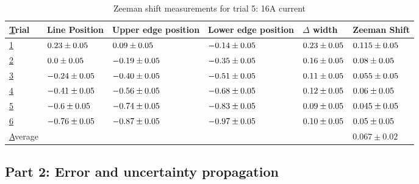 \begin{table}[H]
    \begin{adjustwidth}{-100pt}{-100pt}
        \centering
        \begin{tabular}{|l|l|l|l|l|l|}
            \hline
            {\ul Trial}   & Line Position                & Upper edge position          & Lower edge position          & $\Delta$ width              & Zeeman Shift                 \\ \hline
            {\ul 1}       & $0.23 \pm 0.05$  & $0.09 \pm 0.05$  & $-0.14 \pm 0.05$ & $0.23 \pm 0.05$ & $0.115 \pm 0.05$ \\ \hline
            {\ul 2}       & $0.0 \pm 0.05$   & $-0.19 \pm 0.05$ & $-0.35 \pm 0.05$ & $0.16 \pm 0.05$ & $0.08 \pm 0.05$  \\ \hline
            {\ul 3}       & $-0.24 \pm 0.05$ & $-0.40 \pm 0.05$ & $-0.51 \pm 0.05$ & $0.11 \pm 0.05$ & $0.055 \pm 0.05$ \\ \hline
            {\ul 4}       & $-0.41 \pm 0.05$ & $-0.56 \pm 0.05$ & $-0.68 \pm 0.05$ & $0.12 \pm 0.05$ & $0.06 \pm 0.05$  \\ \hline
            {\ul 5}       & $-0.6 \pm 0.05$  & $-0.74 \pm 0.05$ & $-0.83 \pm 0.05$ & $0.09 \pm 0.05$ & $0.045 \pm 0.05$ \\ \hline
            {\ul 6}       & $-0.76 \pm 0.05$ & $-0.87 \pm 0.05$ & $-0.97 \pm 0.05$ & $0.10 \pm 0.05$ & $0.05 \pm 0.05$  \\ \hline
            {\ul Average} &                              &                              &                              &                             & $0.067 \pm 0.02$             \\ \hline
        \end{tabular}
    \end{adjustwidth}

    \caption{Zeeman shift measurements for trial 5: 16A current}

\end{table}



\subsection{Part 2: Error and uncertainty propagation}
\label{sec:appendix_uncertainty}

